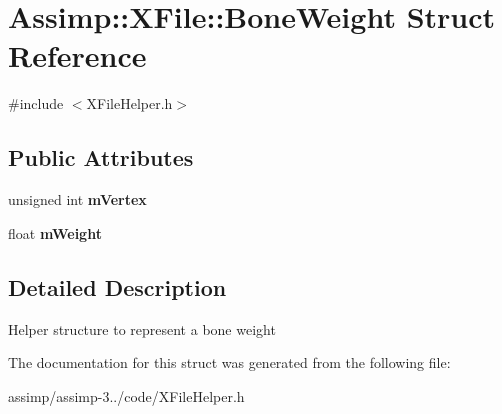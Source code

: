 \hypertarget{struct_assimp_1_1_x_file_1_1_bone_weight}{\section{Assimp\+:\+:X\+File\+:\+:Bone\+Weight Struct Reference}
\label{struct_assimp_1_1_x_file_1_1_bone_weight}
}


{\ttfamily \#include $<$X\+File\+Helper.\+h$>$}

\subsection*{Public Attributes}
\begin{DoxyCompactItemize}
\item 
\hypertarget{struct_assimp_1_1_x_file_1_1_bone_weight_ab3fe26df3ab10e640f678b48130fff1f}{unsigned int {\bfseries m\+Vertex}}\label{struct_assimp_1_1_x_file_1_1_bone_weight_ab3fe26df3ab10e640f678b48130fff1f}

\item 
\hypertarget{struct_assimp_1_1_x_file_1_1_bone_weight_a3aaa1e0414fdc90ede388e3f177a2b6f}{float {\bfseries m\+Weight}}\label{struct_assimp_1_1_x_file_1_1_bone_weight_a3aaa1e0414fdc90ede388e3f177a2b6f}

\end{DoxyCompactItemize}


\subsection{Detailed Description}
Helper structure to represent a bone weight 

The documentation for this struct was generated from the following file\+:\begin{DoxyCompactItemize}
\item 
assimp/assimp-\/3../code/X\+File\+Helper.\+h\end{DoxyCompactItemize}
